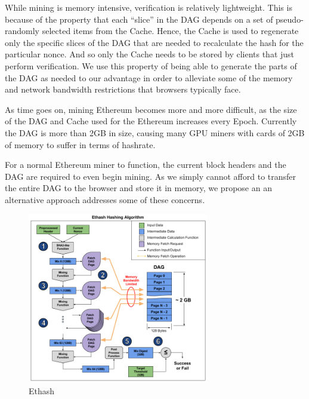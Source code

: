 \documentclass[runningheads]{llncs}
\begin{document}
While mining is memory intensive, verification is relatively lightweight. This is because of the property that each ``slice'' in the DAG depends on a set of pseudo-randomly selected items from the Cache. Hence, the Cache is used to regenerate only the specific slices of the DAG that are needed to recalculate the hash for the particular nonce. And so only the Cache needs to be stored by clients that just perform verification. We use this property of being able to generate the parts of the DAG as needed to our advantage in order to alleviate some of the memory and network bandwidth restrictions that browsers typically face.

As time goes on, mining Ethereum becomes more and more difficult, as the size of the DAG and Cache used for the Ethereum increases every Epoch. Currently the DAG is more than 2GB in size, causing many GPU miners with cards of 2GB of memory to suffer in terms of hashrate. 

For a normal Ethereum miner to function, the current block headers and the DAG are required to even begin mining. As we simply cannot afford to transfer the entire DAG to the browser and store it in memory, we propose an an alternative approach addresses some of these concerns.

\begin{figure}[H]
\centering
\includegraphics[width=300px,keepaspectratio]{ethash_algorithm.png}
\caption{\label{fig:ethash} Ethash}
\end{figure}
\end{document}
